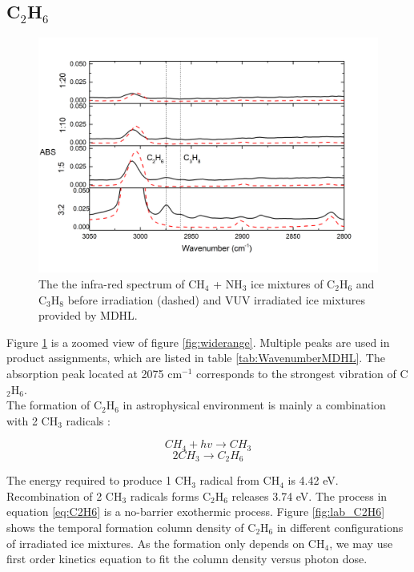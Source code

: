 \subsection{C$_2$H$_6$}

\begin{figure}
\centering
\includegraphics[width=\textwidth]{figures/chapter3/C2H6.png}
\caption{The the infra-red spectrum of CH$_4$ + NH$_3$ ice mixtures of C$_2$H$_6$ and C$_3$H$_8$ before irradiation (dashed) and VUV irradiated ice mixtures provided by MDHL. }
\label{fig:C2H6}
\end{figure}

Figure \ref{fig:C2H6} is a zoomed view of figure \ref{fig:widerange}. Multiple peaks are used in product assignments, which are listed in table \ref{tab:WavenumberMDHL}. The absorption peak located at 2075 cm$^{-1}$ corresponds to the strongest vibration of C$_2$H$_6$. \\

The formation of C$_2$H$_6$ in astrophysical environment is mainly a combination with 2 CH$_3$ radicals \cite{bennett2006laboratory}:

\begin{equation}
CH_4 + hv \rightarrow CH_3
\label{eq:CH3}
\end{equation}
\begin{equation}
2 CH_3 \rightarrow C_2H_6
\label{eq:C2H6}
\end{equation}

The energy required to produce 1 CH$_3$ radical from CH$_4$ is 4.42 eV.  Recombination of 2 CH$_3$ radicals forms C$_2$H$_6$ releases 3.74 eV. The process in equation \ref{eq:C2H6} is a no-barrier exothermic process. Figure \ref{fig:lab_C2H6} shows the temporal formation column density of C$_2$H$_6$ in different configurations of irradiated ice mixtures.  As the formation only depends on CH$_4$, we may use first order kinetics equation to fit the column density versus photon dose.

